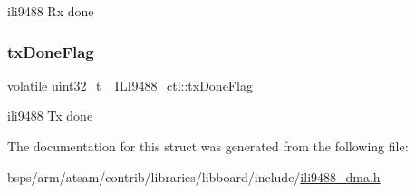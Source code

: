 ili9488 Rx done \mbox{\label{struct__ILI9488__ctl_aa907fcd37359f7542fe34ff4dac957ca}} 
\subsubsection{\texorpdfstring{txDoneFlag}{txDoneFlag}}
{\footnotesize\ttfamily volatile uint32\+\_\+t \+\_\+\+I\+L\+I9488\+\_\+ctl\+::tx\+Done\+Flag}

ili9488 Tx done 

The documentation for this struct was generated from the following file\+:\begin{DoxyCompactItemize}
\item 
bsps/arm/atsam/contrib/libraries/libboard/include/\mbox{\hyperlink{ili9488__dma_8h}{ili9488\+\_\+dma.\+h}}\end{DoxyCompactItemize}

